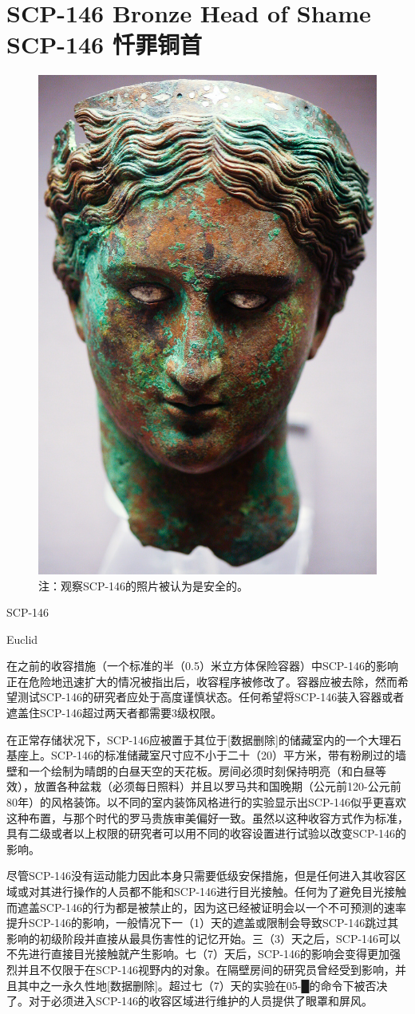\chapter[SCP-146 忏罪铜首]{
    SCP-146 Bronze Head of Shame\\
    SCP-146 忏罪铜首
}

\label{chap:SCP-146}

\begin{figure}[H]
    \centering
    \includegraphics[width=0.5\linewidth]{images/SCP.146.jpg}
    \caption*{注：观察SCP-146的照片被认为是安全的。}
\end{figure}

SCP-146

Euclid

在之前的收容措施（一个标准的半（0.5）米立方体保险容器）中SCP-146的影响正在危险地迅速扩大的情况被指出后，收容程序被修改了。容器应被去除，然而希望测试SCP-146的研究者应处于高度谨慎状态。任何希望将SCP-146装入容器或者遮盖住SCP-146超过两天者都需要3级权限。

在正常存储状况下，SCP-146应被置于其位于{[}数据删除]的储藏室内的一个大理石基座上。SCP-146的标准储藏室尺寸应不小于二十（20）平方米，带有粉刷过的墙壁和一个绘制为晴朗的白昼天空的天花板。房间必须时刻保持明亮（和白昼等效），放置各种盆栽（必须每日照料）并且以罗马共和国晚期（公元前120-公元前80年）的风格装饰。以不同的室内装饰风格进行的实验显示出SCP-146似乎更喜欢这种布置，与那个时代的罗马贵族审美偏好一致。虽然以这种收容方式作为标准，具有二级或者以上权限的研究者可以用不同的收容设置进行试验以改变SCP-146的影响。

尽管SCP-146没有运动能力因此本身只需要低级安保措施，但是任何进入其收容区域或对其进行操作的人员都不能和SCP-146进行目光接触。任何为了避免目光接触而遮盖SCP-146的行为都是被禁止的，因为这已经被证明会以一个不可预测的速率提升SCP-146的影响，一般情况下一（1）天的遮盖或限制会导致SCP-146跳过其影响的初级阶段并直接从最具伤害性的记忆开始。三（3）天之后，SCP-146可以不先进行直接目光接触就产生影响。七（7）天后，SCP-146的影响会变得更加强烈并且不仅限于在SCP-146视野内的对象。在隔壁房间的研究员曾经受到影响，并且其中之一永久性地{[}数据删除]。超过七（7）天的实验在05-█的命令下被否决了。对于必须进入SCP-146的收容区域进行维护的人员提供了眼罩和屏风。

